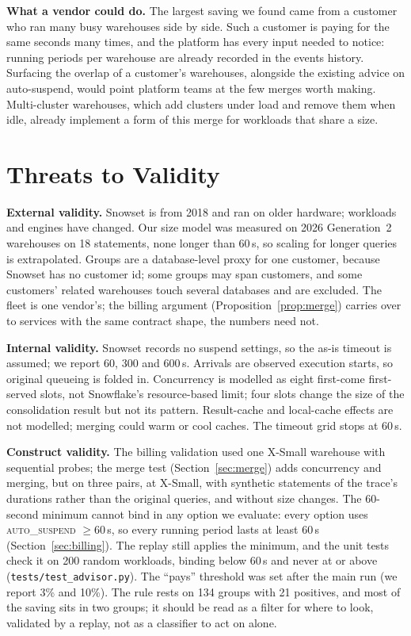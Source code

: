 \documentclass[conference]{IEEEtran}
\newcommand{\autos}{\textsc{auto\_suspend}}
\begin{document}
\textbf{What a vendor could do.} The largest saving we found came from a customer who ran many busy warehouses side by
side. Such a customer is paying for the same seconds many times, and the platform has every input needed to notice:
running periods per warehouse are already recorded in the events history. Surfacing the overlap of a customer's
warehouses, alongside the existing advice on auto-suspend, would point platform teams at the few merges worth making.
Multi-cluster warehouses, which add clusters under load and remove them when idle, already implement a form of this merge
for workloads that share a size.

\section{Threats to Validity}
\textbf{External validity.} Snowset is from 2018 and ran on older hardware; workloads and engines have changed. Our size
model was measured on 2026 Generation~2 warehouses on 18 statements, none longer than 60\,s, so scaling for longer queries
is extrapolated. Groups are a database-level proxy for one customer, because Snowset has no customer id; some groups may
span customers, and some customers' related warehouses touch several databases and are excluded. The fleet is one
vendor's; the billing argument (Proposition~\ref{prop:merge}) carries over to services with the same contract shape, the
numbers need not.

\textbf{Internal validity.} Snowset records no suspend settings, so the as-is timeout is assumed; we report 60, 300 and
600\,s. Arrivals are observed execution starts, so original queueing is folded in. Concurrency is modelled as eight
first-come first-served slots, not Snowflake's resource-based limit; four slots change the size of the consolidation result
but not its pattern. Result-cache and local-cache effects are not modelled; merging could warm or cool caches. The timeout
grid stops at 60\,s.

\textbf{Construct validity.} The billing validation used one X-Small warehouse with sequential probes; the merge test
(Section~\ref{sec:merge}) adds concurrency and merging, but on three pairs, at X-Small, with synthetic statements of the
trace's durations rather than the original queries, and without size changes. The 60-second minimum cannot bind in any option we evaluate: every option uses \autos{}
$\ge 60$\,s, so every running period lasts at least 60\,s (Section~\ref{sec:billing}). The replay still applies the
minimum, and the unit tests check it on 200 random workloads, binding below 60\,s and never at or above
(\texttt{tests/test\_advisor.py}). The ``pays'' threshold was set after the main run (we report 3\% and 10\%).
The rule rests on 134 groups with 21 positives, and most of the saving sits in two groups; it should be read as a filter
for where to look, validated by a replay, not as a classifier to act on alone.
\end{document}
